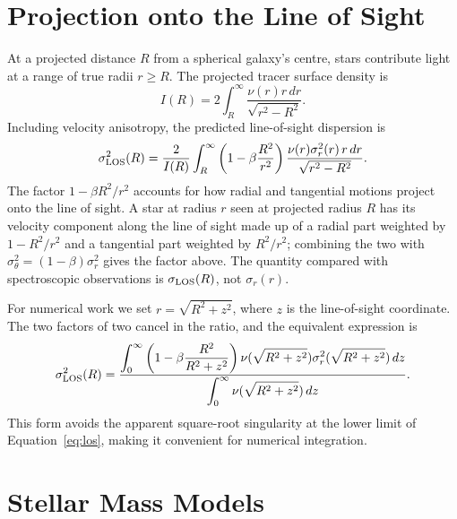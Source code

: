 \documentclass[12pt,a4paper]{report}
\numberwithin{equation}{chapter}
\begin{document}
\section{Projection onto the Line of Sight}

At a projected distance $R$ from a spherical galaxy's centre, stars contribute light at a range of true radii $r\ge R$. The projected tracer surface density is
\begin{equation}
 I(R)=2\int_R^\infty\frac{\nu(r)r\,dr}{\sqrt{r^2-R^2}}.
 \label{eq:projectedensity}
\end{equation}
Including velocity anisotropy, the predicted line-of-sight dispersion is \cite{mamon2005}
\begin{equation}
 \sigma_{\rm LOS}^2(R)=\frac{2}{I(R)}
 \int_R^\infty
 \left(1-\beta\frac{R^2}{r^2}\right)
 \frac{\nu(r)\sigma_r^2(r)\,r\,dr}{\sqrt{r^2-R^2}}.
 \label{eq:los}
\end{equation}
The factor $1-\beta R^2/r^2$ accounts for how radial and tangential motions project onto the line of sight. A star at radius $r$ seen at projected radius $R$ has its velocity component along the line of sight made up of a radial part weighted by $1-R^2/r^2$ and a tangential part weighted by $R^2/r^2$; combining the two with $\sigma_\theta^2=(1-\beta)\sigma_r^2$ gives the factor above. The quantity compared with spectroscopic observations is $\sigma_{\rm LOS}(R)$, not $\sigma_r(r)$.

For numerical work we set $r=\sqrt{R^2+z^2}$, where $z$ is the line-of-sight coordinate. The two factors of two cancel in the ratio, and the equivalent expression is
\begin{equation}
 \sigma_{\rm LOS}^2(R)=
 \frac{\displaystyle\int_0^\infty
  \left(1-\beta\frac{R^2}{R^2+z^2}\right)
  \nu(\sqrt{R^2+z^2})\sigma_r^2(\sqrt{R^2+z^2})\,dz}
 {\displaystyle\int_0^\infty \nu(\sqrt{R^2+z^2})\,dz}.
 \label{eq:losz}
\end{equation}
This form avoids the apparent square-root singularity at the lower limit of Equation~\eqref{eq:los}, making it convenient for numerical integration.

\section{Stellar Mass Models}
\end{document}
